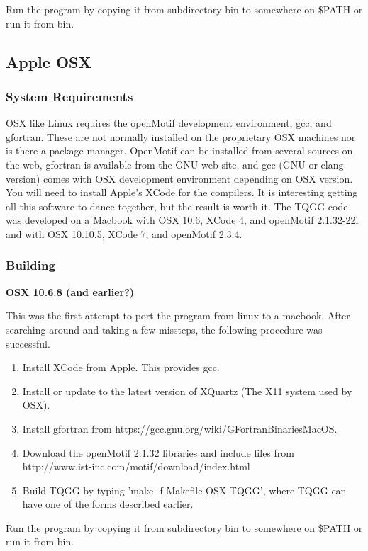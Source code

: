 \documentclass{article}
\begin{document}
Run the program by copying it from subdirectory bin to somewhere on \$PATH or run it from bin. 

\subsection{Apple OSX}
\subsubsection{System Requirements}
OSX like Linux requires the openMotif development environment, gcc, and gfortran. These are
not normally installed on the proprietary OSX machines nor is there a package manager. 
OpenMotif can be installed from several
sources on the web, gfortran is available from the GNU web site, and gcc (GNU or clang version) 
comes with OSX development environment depending on OSX version. You will need to install
Apple's XCode for the compilers. It is interesting getting all this software to dance together,
but the result is worth it. The TQGG code was developed on a Macbook with OSX 10.6,
XCode 4, and openMotif 2.1.32-22i and with OSX 10.10.5, XCode 7, and openMotif 2.3.4.

\subsubsection{Building}

 {\bf{OSX 10.6.8 (and earlier?)}}

This was the first attempt to port the program from linux to a macbook. After searching around
and taking a few missteps, the following procedure was successful.

\begin{enumerate}
 \item Install XCode from Apple. This provides gcc.
 \item Install or update to the latest version of XQuartz (The X11 system used by OSX). 
 \item Install gfortran from https://gcc.gnu.org/wiki/GFortranBinariesMacOS.
 \item Download the openMotif 2.1.32 libraries and include files from \\
 http://www.ist-inc.com/motif/download/index.html
 \item Build TQGG by typing 'make -f Makefile-OSX TQGG', where TQGG can have one of the forms described earlier.
\end{enumerate}

Run the program by copying it from subdirectory bin to somewhere on \$PATH or run it from bin. \\
\end{document}
